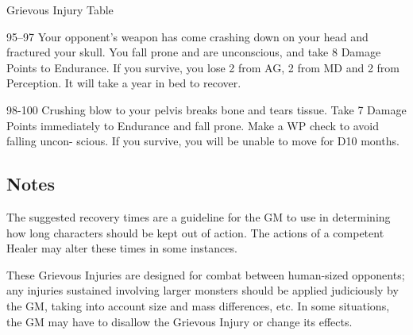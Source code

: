 \begin{Chapter}{Grievous Injury Table}
\begin{Description}
\item[95–97] Your opponent’s weapon has come crashing down on your
  head and fractured your skull. You fall prone and are unconscious,
  and take 8 Damage Points to Endurance.  If you survive, you lose 2
  from AG, 2 from MD and 2 from Perception. It will take a year in bed
  to recover.

\item[98-100] Crushing blow to your pelvis breaks bone and tears
  tissue. Take 7 Damage Points immediately to Endurance and fall
  prone.  Make a WP check to avoid falling uncon- scious. If you
  survive, you will be unable to move for D10 months.

\end{Description}

\subsection{Notes}

The suggested recovery times are a guideline for the GM to use in
determining how long characters should be kept out of action. The
actions of a competent Healer may alter these times in some instances.

These Grievous Injuries are designed for combat between human-sized
opponents; any injuries sustained involving larger monsters should be
applied judiciously by the GM, taking into account size and mass
differences, etc.  In some situations, the GM may have to disallow the
Grievous Injury or change its effects.

\end{Chapter}
